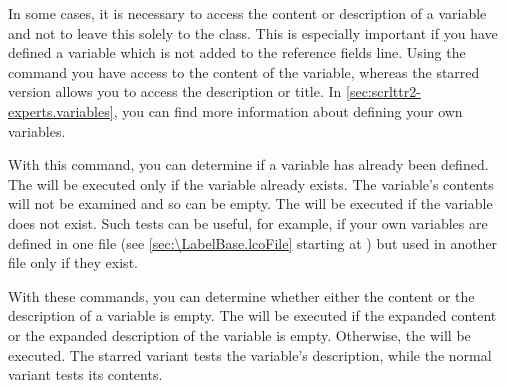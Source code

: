 \begin{Declaration}
\end{Declaration}
In some cases, it is necessary to access
the content or description of a variable and not to leave this solely to the
class. This is especially important if you have defined a variable which is
not added to the reference fields line. Using the command 
you have access to the content of the  variable, whereas the
starred version  allows you to access the description or
title. In \autoref{sec:scrlttr2-experts.variables},
 you can find more information
about defining your own variables.%
\EndIndexGroup


\begin{Declaration}
\end{Declaration}
With%
 this command, you
can determine if a variable has already been defined. The 
will be executed only if the variable already exists. The variable's contents
will not be examined and so can be empty. The  will be
executed if the variable does not exist. Such tests can be useful, for
example, if your own variables are defined in one  file (see \autoref{sec:\LabelBase.lcoFile} starting at
) but used in another  file only
if they exist.%
\EndIndexGroup


\begin{Declaration}
\end{Declaration}
With%
 these commands,
you can determine whether either the content or the description of a variable
is empty. The  will be executed if the expanded content or
the expanded description of the  variable is empty. Otherwise, the
 will be executed. The starred variant tests the variable's
description, while the normal variant tests its contents.%
\EndIndexGroup
%
\EndIndexGroup


